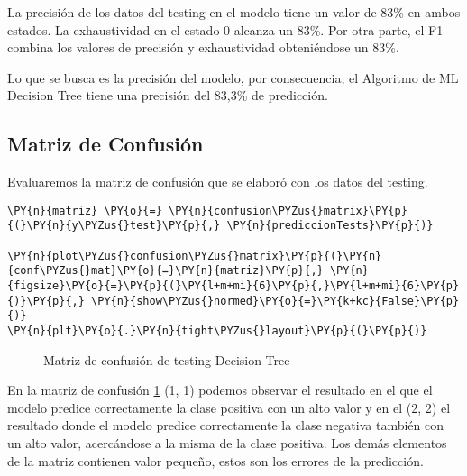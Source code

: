     La precisión de los datos del testing en el modelo tiene un valor de
83\% en ambos estados. La exhaustividad en el estado 0 alcanza un 83\%.
Por otra parte, el F1 combina los valores de precisión y exhaustividad
obteniéndose un 83\%.

Lo que se busca es la precisión del modelo, por consecuencia, el
Algoritmo de ML Decision Tree tiene una precisión del
83,3\% de predicción.

    \hypertarget{matriz-de-confusiuxf3n}{%
\subsection{Matriz de Confusión}\label{matriz-de-confusiuxf3n}}

Evaluaremos la matriz de confusión que se elaboró con los datos del
testing.

    \begin{tcolorbox}[breakable, size=fbox, boxrule=1pt, pad at break*=1mm,colback=cellbackground, colframe=cellborder]
\begin{Verbatim}[commandchars=\\\{\}]
\PY{n}{matriz} \PY{o}{=} \PY{n}{confusion\PYZus{}matrix}\PY{p}{(}\PY{n}{y\PYZus{}test}\PY{p}{,} \PY{n}{prediccionTests}\PY{p}{)}

\PY{n}{plot\PYZus{}confusion\PYZus{}matrix}\PY{p}{(}\PY{n}{conf\PYZus{}mat}\PY{o}{=}\PY{n}{matriz}\PY{p}{,} \PY{n}{figsize}\PY{o}{=}\PY{p}{(}\PY{l+m+mi}{6}\PY{p}{,}\PY{l+m+mi}{6}\PY{p}{)}\PY{p}{,} \PY{n}{show\PYZus{}normed}\PY{o}{=}\PY{k+kc}{False}\PY{p}{)}
\PY{n}{plt}\PY{o}{.}\PY{n}{tight\PYZus{}layout}\PY{p}{(}\PY{p}{)}
\end{Verbatim}
\end{tcolorbox}

\begin{center}
    	\begin{figure}[H]
	\centering
	\caption{Matriz de confusión de testing Decision Tree}
	\label{fig:mctdt}
	\end{figure}
\end{center}
    
    En la matriz de confusión \ref{fig:mctdt} (1, 1) podemos observar el resultado en el que
el modelo predice correctamente la clase positiva con un alto valor y en
el (2, 2) el resultado donde el modelo predice correctamente la clase
negativa también con un alto valor, acercándose a la misma de la clase
positiva. Los demás elementos de la matriz contienen valor pequeño,
estos son los errores de la predicción.

